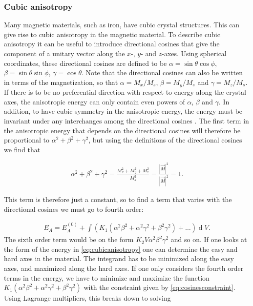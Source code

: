 \documentclass[1p]{elsarticle}		%
\renewcommand{\d}[1]{\ensuremath{\operatorname{d}\!{#1}}}
\begin{document}
\subsubsection{Cubic anisotropy}
Many magnetic materials, such as iron, have cubic crystal structures. This can give rise to cubic anisotropy in the magnetic material. To describe cubic anisotropy it can be useful to introduce directional cosines that give the component of a unitary vector along the $x$-, $y$- and $z$-axes. Using spherical coordinates, these directional cosines are defined to be $\alpha = \sin\theta\cos\phi$, $\beta = \sin\theta\sin\phi$, $\gamma = \cos\theta$. Note that the directional cosines can also be written in terms of the magnetization, so that $\alpha = M_x/M_s$, $\beta = M_y/M_s$ and $\gamma = M_z/M_s$. If there is to be no preferential direction with respect to energy along the crystal axes, the anisotropic energy can only contain even powers of $\alpha$, $\beta$ and $\gamma$. In addition, to have cubic symmetry in the anisotropic energy, the energy must be invariant under any interchanges among the directional cosines \cite{Kittel:ISSP}. The first term in the anisotropic energy that depends on the directional cosines will therefore be proportional to $\alpha^2+\beta^2+\gamma^2$, but using the definitions of the directional cosines we find that

\begin{align}
\label{eq:cosinesconstraint}
\alpha^2+\beta^2+\gamma^2 = \frac{M_x^2+M_y^2+M_z^2}{M_s^2} = \frac{|\vec{M}|^2}{|\vec{M}|^2} = 1.
\end{align}

This term is therefore just a constant, so to find a term that varies with the directional cosines we must go to fourth order:

\begin{align}
\label{eq:cubicanisotropy}
E_A = E_A^{(0)} + \int (K_1 (\alpha^2\beta^2+\alpha^2\gamma^2+\beta^2\gamma^2) + \ldots ) \d V.
\end{align}
The sixth order term would be on the form $K_2 V \alpha^2\beta^2\gamma^2$ and so on. If one looks at the form of the energy in \eqref{eq:cubicanisotropy} one can determine the easy and hard axes in the material. The integrand has to be minimized along the easy axes, and maximized along the hard axes. If one only considers the fourth order terms in the energy, we have to minimize and maximize the function $K_1 (\alpha^2\beta^2+\alpha^2\gamma^2+\beta^2\gamma^2)$ with the constraint given by \eqref{eq:cosinesconstraint}. Using Lagrange multipliers, this breaks down to solving 
\end{document}
